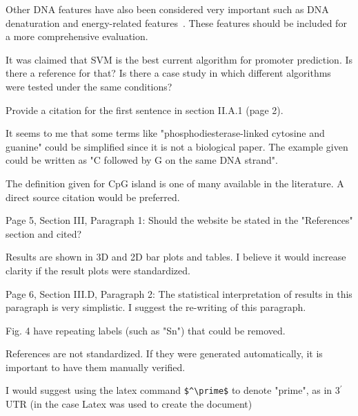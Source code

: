 \documentclass[11pt]{article}
\begin{document}
 Other DNA features have also been considered very important such as DNA denaturation and energy-related features~\cite{gan2012}. These features should be included for a more comprehensive evaluation.

 It was claimed that SVM is the best current algorithm for promoter prediction. Is there a reference for that? Is there a case study in which different algorithms were tested under the same conditions?

 Provide a citation for the first sentence in section II.A.1 (page 2).

 It seems to me that some terms like "phosphodiesterase-linked cytosine and guanine" could be simplified since it is not a biological paper. The example given could be written as "C followed by G on the same DNA strand".

 The definition given for CpG island is one of many available in the literature. A direct source citation would be preferred.

 Page 5, Section III, Paragraph 1: Should the website be stated in the "References" section and cited?

 Results are shown in 3D and 2D bar plots and tables. I believe it would increase clarity if the result plots were standardized.

 Page 6, Section III.D, Paragraph 2: The statistical interpretation of results in this paragraph is very simplistic. I suggest the re-writing of this paragraph.

 Fig. 4 have repeating labels (such as "Sn") that could be removed.

 References are not standardized. If they were generated automatically, it is important to have them manually verified.

 I would suggest using the latex command \verb!$^\prime$! to denote "prime", as in 3$^\prime$UTR (in the case Latex was used to create the document)
\end{document}
